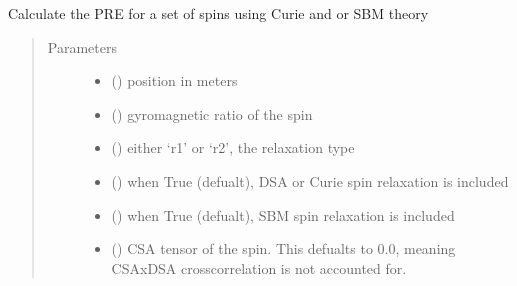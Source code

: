 \documentclass[a4paper,10pt,english]{sphinxmanual}
\begin{document}
\begin{fulllineitems}
\begin{fulllineitems}
\begin{fulllineitems}
\label{\detokenize{reference/generated/paramagpy.metal.Metal.pre:paramagpy.metal.Metal.pre}}
Calculate the PRE for a set of spins using Curie and or SBM theory
\begin{quote}\begin{description}
\item[{Parameters}] \leavevmode\begin{itemize}
\item {} 
 () \textendash{} position in meters

\item {} 
 () \textendash{} gyromagnetic ratio of the spin

\item {} 
 () \textendash{} either ‘r1’ or ‘r2’, the relaxation type

\item {} 
 (\sphinxstyleliteralemphasis{\sphinxupquote{ (}}\sphinxstyleliteralemphasis{\sphinxupquote{)}}) \textendash{} when True (defualt), DSA or Curie spin relaxation is included

\item {} 
 (\sphinxstyleliteralemphasis{\sphinxupquote{ (}}\sphinxstyleliteralemphasis{\sphinxupquote{)}}) \textendash{} when True (defualt), SBM spin relaxation is included

\item {} 
 (\sphinxstyleliteralemphasis{\sphinxupquote{ (}}\sphinxstyleliteralemphasis{\sphinxupquote{,}}\sphinxstyleliteralemphasis{\sphinxupquote{) }}\sphinxstyleliteralemphasis{\sphinxupquote{(}}\sphinxstyleliteralemphasis{\sphinxupquote{)}}) \textendash{} CSA tensor of the spin.
This defualts to 0.0, meaning CSAxDSA crosscorrelation is
not accounted for.


\end{itemize}
\end{description}
\end{quote}
\end{fulllineitems}
\end{fulllineitems}
\end{fulllineitems}
\end{document}
